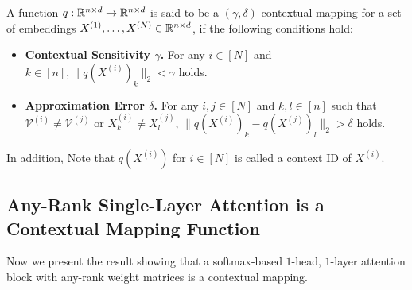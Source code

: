 \begin{definition}  \label{def:contextual_mapping_new}
A function $q:\mathbb{R}^{n\times d} \to \mathbb{R}^{n\times d}$ is said to be a $(\gamma, \delta)$-contextual mapping for a set of embeddings  $X^{(1)}, \hdots, X^{(N)} \in \mathbb{R}^{n\times d}$,  if the following conditions hold:
    \begin{itemize}
        \item {\bf Contextual Sensitivity $\gamma$.}
        For any $i \in[N]$ and $k \in[n],  \|q (X^{(i)})_k\|_2 < \gamma$ holds.
    
        \item {\bf Approximation Error $\delta$.}
        For any $i, j \in[N]$ and $k, l \in[n]$ such that $\mathcal{V}^{(i)} \neq \mathcal{V}^{(j)}$ or $X_k^{(i)} \neq X_l^{(j)}$, $\|q(X^{(i)})_k-q(X^{(j)})_l\|_2 > \delta$ holds.
    \end{itemize}
In addition, Note that $q (X^{(i)})$ for $i \in[N]$ is called a context ID of $X^{(i)}$.    
\end{definition}


\subsection{Any-Rank Single-Layer Attention is a Contextual Mapping Function}\label{sec:any_rank_attn_contmap}

Now we present the result showing that a softmax-based $1$-head, $1$-layer attention block with any-rank weight matrices is a contextual mapping.

